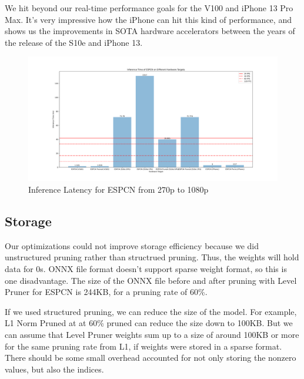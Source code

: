 \documentclass{article}
\begin{document}
We hit beyond our real-time performance goals for the V100 and iPhone 13 Pro Max. It's very impressive how the iPhone can hit this kind of performance, and shows us the improvements in SOTA hardware accelerators between the years of the release of the S10e and iPhone 13.

\begin{figure}
	\centerline{\includegraphics[width=8in]{../final/figures/inference_times.png}}
	\caption{Inference Latency for ESPCN from 270p to 1080p}
	\label{fig:inference-times}
\end{figure}


\subsection{Storage}
Our optimizations could not improve storage efficiency because we did unstructured pruning rather than structrued pruning. Thus, the weights will hold data for 0s. ONNX file format doesn't support sparse weight format, so this is one disadvantage. The size of the ONNX file before and after pruning with Level Pruner for ESPCN is 244KB, for a pruning rate of 60\%.

If we used structured pruning, we can reduce the size of the model. For example, L1 Norm Pruned at at 60\% pruned can reduce the size down to 100KB. But we can assume that Level Pruner weights sum up to a size of around 100KB or more for the same pruning rate from L1, if weights were stored in a sparse format. There should be some small overhead accounted for not only storing the nonzero values, but also the indices.
\end{document}
